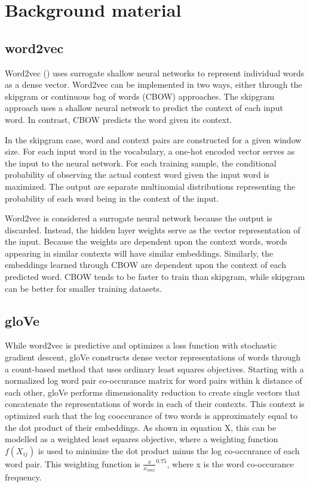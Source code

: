 \section{\label{sec:level3} Background material}

\subsection{word2vec}

Word2vec (\cite{word2vec}) uses surrogate shallow neural networks to represent individual words as a dense vector. Word2vec can be implemented in two ways, either through the skipgram or continuous bag of words (CBOW) approaches. The skipgram approach uses a shallow neural network to predict the context of each input word. In contrast, CBOW predicts the word given its context. 

In the skipgram case, word and context pairs are constructed for a given window size. For each input word in the vocabulary, a one-hot encoded vector serves as the input to the neural network. For each training sample, the conditional probability of observing the actual context word given the input word is maximized. The output are separate multinomial distributions representing the probability of each word being in the context of the input.

Word2vec is considered a surrogate neural network because the output is discarded. Instead, the hidden layer weights serve as the vector representation of the input. Because the weights are dependent upon the context words, words appearing in similar contexts will have similar embeddings. Similarly, the embeddings learned through CBOW are dependent upon the context of each predicted word. CBOW tends to be faster to train than skipgram, while skipgram can be better for smaller training datasets.

\subsection{gloVe}

While word2vec is predictive and optimizes a loss function with stochastic gradient descent, gloVe constructs dense vector representations of words through a count-based method that uses ordinary least squares objectives. Starting with a normalized log word pair co-occurance matrix for word pairs within k distance of each other, gloVe performs dimensionality reduction to create single vectors that concatenate the representations of words in each of their contexts. This context is optimized such that the log cooccurance of two words is approximately equal to the dot product of their embeddings. As shown in equation X, this can be modelled as a weighted least squares objective, where a weighting function $f(X_{ij})$ is used to minimize the dot product minus the log co-occurance of each word pair. This weighting function is $\frac{x}{x_{max}}^{0.75}$, where x is the word co-occurance frequency. 

